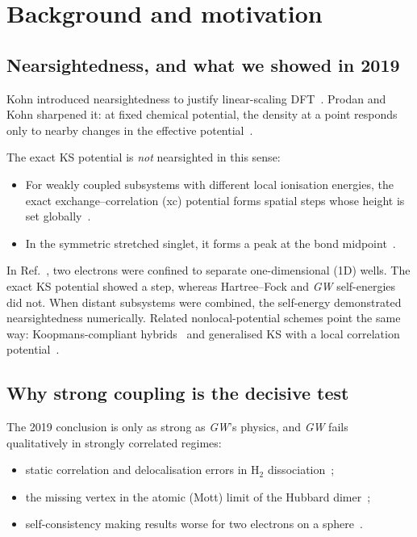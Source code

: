 \documentclass[11pt,a4paper]{article}
\newcommand{\GW}{\textit{GW}}
\begin{document}
\section{Background and motivation}

\subsection{Nearsightedness, and what we showed in 2019}
Kohn introduced nearsightedness to justify linear-scaling DFT~\cite{kohn1996}. Prodan and Kohn sharpened it: at fixed chemical potential, the density at a point responds only to nearby changes in the effective potential~\cite{prodan2005}.

The exact KS potential is \emph{not} nearsighted in this sense:
\begin{itemize}
\item For weakly coupled subsystems with different local ionisation energies, the exact exchange--correlation (xc) potential forms spatial steps whose height is set globally~\cite{kraisler2021,hodgson2016,hodgson2017}.
\item In the symmetric stretched singlet, it forms a peak at the bond midpoint~\cite{buijse1989,helbig2009}.
\end{itemize}

In Ref.~\cite{wetherell2019}, two electrons were confined to separate one-dimensional (1D) wells. The exact KS potential showed a step, whereas Hartree--Fock and \GW{} self-energies did not. When distant subsystems were combined, the self-energy demonstrated nearsightedness numerically. Related nonlocal-potential schemes point the same way: Koopmans-compliant hybrids~\cite{elmaslmane2018} and generalised KS with a local correlation potential~\cite{hodgson2020}.

\subsection{Why strong coupling is the decisive test}
The 2019 conclusion is only as strong as \GW's physics, and \GW{} fails qualitatively in strongly correlated regimes:
\begin{itemize}
\item static correlation and delocalisation errors in H$_2$ dissociation~\cite{caruso2013,hellgren2015};
\item the missing vertex in the atomic (Mott) limit of the Hubbard dimer~\cite{romaniello2009};
\item self-consistency making results worse for two electrons on a sphere~\cite{loos2018}.
\end{itemize}
\end{document}
